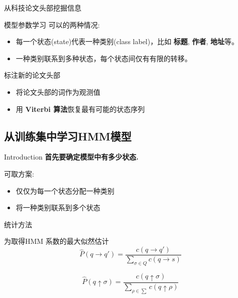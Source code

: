 \documentclass{beamer}
\begin{document}
\begin{frame}{ 从科技论文头部挖掘信息}
    \begin{block}{模型参数学习}
        可以的两种情况:
        \begin{itemize}
            \pause
            \item 每一个状态(state)代表一种类别(class label)，比如 \textbf{标题}, \textbf{作者}, \textbf{地址}等。
            \pause
            \item 一种类别联系到多种状态，每个状态间仅有有限的转移。
        \end{itemize}
    \end{block}
    
            \pause
    \begin{block}{ 标注新的论文头部}
        \begin{itemize}
            \item 将论文头部的词作为观测值
            \item 用 \textbf{Viterbi 算法}恢复最有可能的状态序列
        \end{itemize}
    \end{block}
\end{frame}

\subsection{从训练集中学习HMM模型}
\begin{frame}{Introduction}
    \textbf{首先要确定模型中有多少状态.}
            \pause
    \begin{block}{可取方案:}
        \begin{itemize}
            \pause
            \item 仅仅为每一个状态分配一种类别
            \pause
            \item 将一种类别联系到多个状态
        \end{itemize}
    \end{block}
\end{frame}

\begin{frame}{统计方法}
    \begin{block}{ 为取得HMM 系数的最大似然估计}
    \begin{equation}
        \hat{P}(q \rightarrow q') = 
        \frac{c(q \rightarrow q')}
        {\sum_{\sigma \in Q}{c(q \rightarrow s)}}
    \end{equation}

    \begin{equation}
        \hat{P}(q \uparrow \sigma) = 
        \frac{c(q\uparrow \sigma)}
        {\sum_{\rho \in \sum}{c(q \uparrow \rho)}}
    \end{equation}
    \end{block}
\end{frame}
\end{document}
